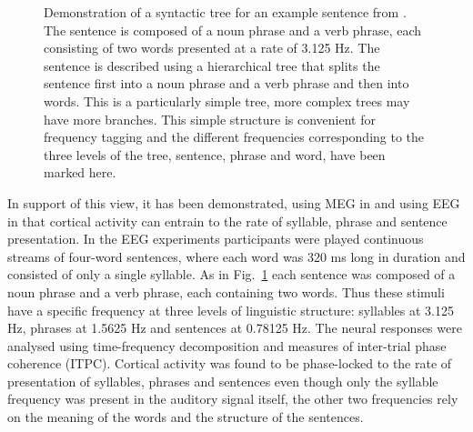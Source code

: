 \documentclass[10pt,letterpaper]{article}
\begin{document}
\begin{figure}[tb]
\begin{center}
\end{center}
\caption{Demonstration of a syntactic tree for an example sentence
  from \cite{DingEtAl2016, DingEtAl2017}. The sentence is composed of
  a noun phrase and a verb phrase, each consisting of two words
  presented at a rate of 3.125 Hz.  The sentence is described using a
  hierarchical tree that splits the sentence first into a noun phrase
  and a verb phrase and then into words. This is a particularly simple
  tree, more complex trees may have more branches. This simple
  structure is convenient for frequency tagging and the different
  frequencies corresponding to the three levels of the tree, sentence,
  phrase and word, have been marked here.}
\label{fig:freq_tree}
\end{figure}

In support of this view, it has been demonstrated, using MEG in
\cite{DingEtAl2016} and using EEG in \cite{DingEtAl2017} that cortical
activity can entrain to the rate of syllable, phrase and sentence
presentation. In the EEG experiments participants were played
continuous streams of four-word sentences, where each word was 320 ms
long in duration and consisted of only a single syllable. As in
Fig.~\ref{fig:freq_tree} each sentence was composed of a noun phrase
and a verb phrase, each containing two words. Thus these stimuli
have a specific frequency at three levels of linguistic structure:
syllables at 3.125 Hz, phrases at 1.5625 Hz and sentences at 0.78125
Hz. The neural responses were analysed using time-frequency
decomposition and measures of inter-trial phase coherence
(ITPC). Cortical activity was found to be phase-locked to the rate of
presentation of syllables, phrases and sentences even though only the
syllable frequency was present in the auditory signal itself, the other
two frequencies rely on the meaning of the words and the structure of
the sentences.
\end{document}
